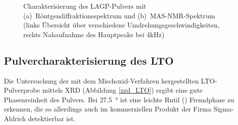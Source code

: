 \documentclass[a4paper, 11pt, headsepline,footsepline,twoside,abstract]{scrbook}
\begin{document}
\begin{figure}
   \centering
       \vspace{6mm}
       \vspace{3mm}
	\caption{Charakterisierung des LAGP-Pulvers mit (a)~Röntgen\-diffraktionsspektrum und (b)~MAS-NMR-Spektrum (links Übersicht über verschiedene Umdrehungsgeschwindigkeiten, rechts Nahaufnahme des Hauptpeaks bei 4kHz)}
   	\label{pulver_LAGP}
\end{figure}
\subsection{Pulvercharakterisierung des LTO}
Die Untersuchung der mit dem Mischoxid-Verfahren hergestellten LTO-Pulverprobe mittels XRD (Abbildung \ref{xrd_LTO}) ergibt eine gute Phasenreinheit des Pulvers. Bei \SI{27.5}{\degree} ist eine leichte Rutil () Fremdphase zu erkennen, die so allerdings auch im kommerziellen Produkt der Firma Sigma-Aldrich detektierbar ist. 
\end{document}
